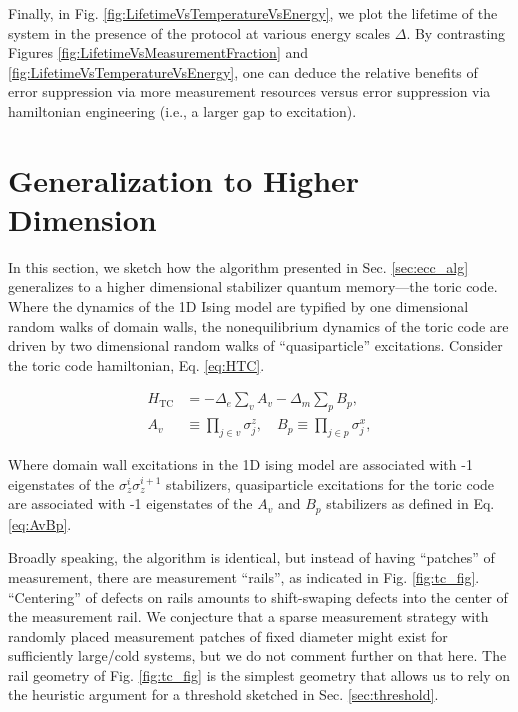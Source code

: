 \documentclass[twocolumn,superscriptaddress,aps,prb,floatfix]{revtex4-1}
\newcommand{\Htc}{H_{\mathrm{TC}}}
\newcommand{\figref}[1]{Fig. \ref{#1}}
\begin{document}

Finally, in Fig. \ref{fig:LifetimeVsTemperatureVsEnergy}, we plot the lifetime of the system in the presence of the protocol at various energy scales $\Delta$.  By contrasting Figures \ref{fig:LifetimeVsMeasurementFraction} and \ref{fig:LifetimeVsTemperatureVsEnergy}, one can deduce the relative benefits of error suppression via more measurement resources versus error suppression via hamiltonian engineering (i.e., a larger gap to excitation).



\section{Generalization to Higher Dimension}
\label{sec:tc_alg}

 In this section, we sketch how the algorithm presented in Sec. \ref{sec:ecc_alg} generalizes to a higher dimensional stabilizer quantum memory---the toric code.  Where the dynamics of the 1D Ising model are typified by one dimensional random walks of domain walls, the nonequilibrium dynamics of the toric code are driven by two dimensional random walks of ``quasiparticle'' excitations.  Consider the toric code hamiltonian, Eq. \ref{eq:HTC}.

 \begin{align}
\Htc &= -\Delta_e \sum_v A_v -\Delta_m \sum_p B_p ,\label{eq:HTC}\\
A_v &\equiv \prod_{j \in v} \sigma_j^z,\quad B_p \equiv \prod_{j \in p} \sigma_j^x,\label{eq:AvBp}
\end{align}

Where domain wall excitations in the 1D ising model are associated with -1 eigenstates of the $\sigma_z^i \sigma_z^{i+1}$ stabilizers, quasiparticle excitations for the toric code are associated with -1 eigenstates of the $A_v$ and $B_p$ stabilizers as defined in Eq. \ref{eq:AvBp}.
 
 Broadly speaking, the algorithm is identical, but instead of having ``patches'' of measurement, there are measurement ``rails'', as indicated in \figref{fig:tc_fig}.  ``Centering'' of defects on rails amounts to shift-swaping defects into the center of the measurement rail.  We conjecture that a sparse measurement strategy with randomly placed measurement patches of fixed diameter might exist for sufficiently large/cold systems, but we do not comment further on that here.  The rail geometry of \figref{fig:tc_fig} is the simplest geometry that allows us to rely on the heuristic argument for a threshold sketched in Sec. \ref{sec:threshold}.
\end{document}
